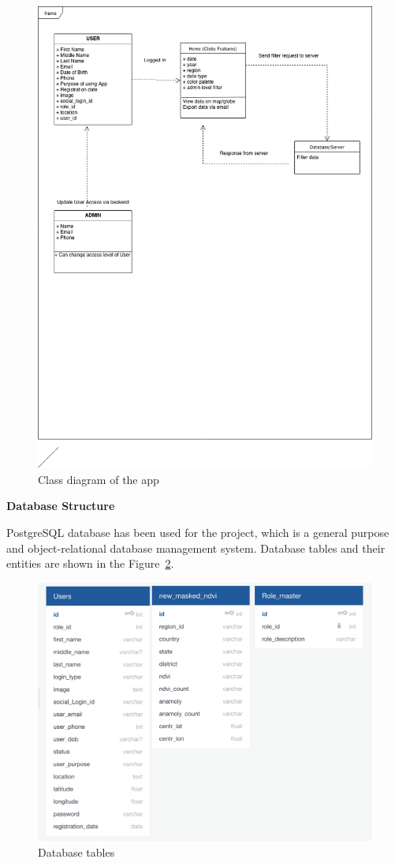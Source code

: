     \begin{figure}[H]
            \centering
            \includegraphics[width=0.8\linewidth]{figures/ch3/classdiagram.png}
            \caption{\label{fig:class_diag} Class diagram of the app}
    \end{figure}
  
 \centerline{\textbf{Database Structure}}    
  PostgreSQL database has been used for the project, which is a general purpose and object-relational database management system. 
  Database tables and their entities are shown in the Figure~\ref{fig:database_structure}.
  
  \begin{figure}[H]
            \centering
            \includegraphics[width=1.0\linewidth]{figures/ch3/database_structure.png}
            \caption{\label{fig:database_structure} Database tables}
    \end{figure}
